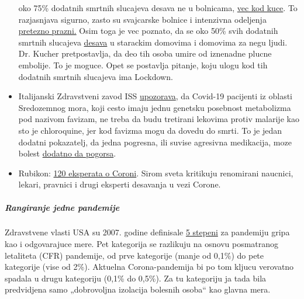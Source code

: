 \begin{itemize}
  oko 75\% dodatnih smrtnih slucajeva desava ne u bolnicama,
  \href{https://www.tagesspiegel.de/wissen/woran-sterben-corona-patienten-wirklich-ein-schweizer-forscher-macht-hoffnung-im-kampf-gegen-covid-19/25750666.html}{vec
  kod kuce}. To razjasnjava sigurno, zasto su svajcarske bolnice i
  intenzivna odeljenja
  \href{https://swprs.files.wordpress.com/2020/04/intensivbettenbelegung-schweiz-2020-04-14.png}{pretezno
  prazni.} Osim toga je vec poznato, da se oko 50\% svih dodatnih
  smrtnih slucajeva
  \href{https://www.nzz.ch/zuerich/coronavirus-zuerich-aendert-nun-das-testregime-in-heimenauch-viele-aeltere-covid-19-infizierte-entwickeln-keine-symptome-zuerich-aendert-nun-das-testregime-in-heimen-ld.1552089}{desava}
  u starackim domovima i domovima za negu ljudi. Dr. Kucher
  pretpostavlja, da deo tih osoba umire od iznenadne plucne embolije. To
  je moguce. Opet se postavlja pitanje, koju ulogu kod tih dodatnih
  smrtnih slucajeva ima Lockdown.
\item
  Italijanski Zdravstveni zavod ISS
  \href{https://www.iss.it/en/rapporti-covid-19/-/asset_publisher/btw1J82wtYzH/content/id/5334891}{upozorava},
  da Covid-19 pacijenti iz oblasti Sredozemnog mora, koji cesto imaju
  jednu genetsku posebnost metabolizma pod nazivom favizam, ne treba da
  budu tretirani lekovima protiv malarije kao sto je chloroquine, jer
  kod favizma mogu da dovedu do smrti. To je jedan dodatni pokazatelj,
  da jedna pogresna, ili suvise agresivna medikacija, moze bolest
  \href{https://www.sciencedaily.com/releases/2020/02/200206110703.htm}{dodatno
  da pogorsa}.
\item
  Rubikon:
  \href{https://www.rubikon.news/artikel/120-expertenstimmen-zu-corona}{120
  eksperata o Coroni}. Sirom sveta kritikuju renomirani naucnici,
  lekari, pravnici i drugi eksperti desavanja u vezi Corone.
\end{itemize}

\hypertarget{rangiranje-jedne-pandemije}{%
\subparagraph{\texorpdfstring{\textbf{Rangiranje jedne
pandemije}}{Rangiranje jedne pandemije}}\label{rangiranje-jedne-pandemije}}

Zdravstvene vlasti USA su 2007. godine definisale
\href{https://www.cidrap.umn.edu/news-perspective/2007/02/hhs-ties-pandemic-mitigation-advice-severity}{5
stepeni} za pandemiju gripa kao i odgovarajuce mere. Pet kategorija se
razlikuju na osnovu posmatranog letaliteta (CFR) pandemije, od prve
kategorije (manje od 0,1\%) do pete kategorije (vise od 2\%). Aktuelna
Corona-pandemija bi po tom kljucu verovatno spadala u drugu kategoriju
(0,1\% do 0,5\%). Za tu kategoriju ja tada bila predvidjena samo
„dobrovoljna izolacija bolesnih osoba`` kao glavna mera.

